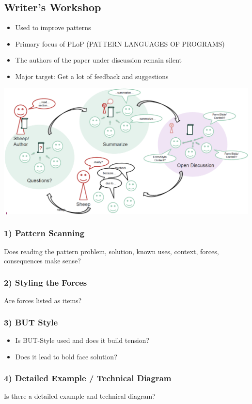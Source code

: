 \subsection{Writer's Workshop}
\begin{itemize}
    \item Used to improve patterns
    \item Primary focus of PLoP (PATTERN LANGUAGES OF PROGRAMS)
    \item The authors of the paper under discussion remain silent
    \item Major target: Get a lot of feedback and suggestions
\end{itemize}
\includegraphics[width=\linewidth]{./img/writers_workshop.png}

\subsubsection{1) Pattern Scanning}
Does reading the pattern problem, solution, known uses, context, forces, consequences make sense?

\subsubsection{2) Styling the Forces}
Are forces listed as items?

\subsubsection{3) BUT Style}
\begin{itemize}
    \item Is BUT-Style used and does it build tension?
    \item Does it lead to bold face solution?
\end{itemize}

\subsubsection{4) Detailed Example / Technical Diagram}
Is there a detailed example and technical diagram?

